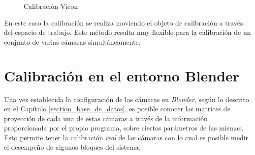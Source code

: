 \begin{figure}[ht!]
        \centering        
        \hspace{1.8cm}
  \caption{Calibración Vicon}
      \label{vicon}
\end{figure}

En este caso la calibración se realiza moviendo el objeto de calibración a través del espacio de trabajo. Este método resulta muy flexible para la calibración de un conjunto de varias cámaras simultáneamente.


\section{Calibración en el entorno Blender}

Una vez establecida la configuración de las cámaras en \emph{Blender}, según lo descrito en el Capítulo \ref{section_base_de_datos}, es posible conocer las matrices de proyección de cada una de estas cámaras a través de la información proporcionada por el propio programa, sobre ciertos parámetros de las mismas. Esto permite tener la calibración \textit{real} de las cámaras con lo cual es posible medir el desempeño de algunos bloques del sistema.\\

